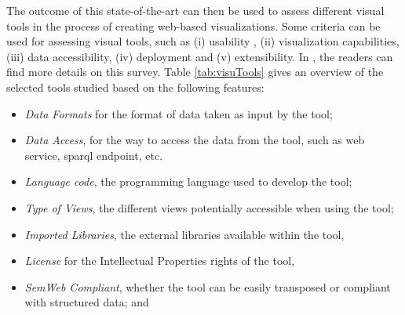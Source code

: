 The outcome of this state-of-the-art can then be used to assess different visual tools in the process of creating web-based visualizations. Some criteria can be used for assessing visual tools, such as (i) usability , (ii) visualization capabilities, (iii) data accessibility, (iv) deployment and (v) extensibility. In \cite{deliverable2012b}, the readers can find more details on this survey. Table \ref{tab:visuTools} gives an overview of the selected tools studied based on the following features:
\begin{itemize}
\item \textit{Data Formats} for the format of data taken as input by the tool;
\item \textit{Data Access}, for the way to access the data from the tool, such as web service, sparql endpoint, etc.
\item \textit{Language code}, the programming language used to develop the tool;
\item \textit{Type of Views}, the different views potentially accessible when using the tool;
\item \textit{Imported Libraries}, the external libraries available within the tool,
\item \textit{License} for the Intellectual Properties rights of the tool,
\item \textit{SemWeb Compliant}, whether the tool can be easily transposed or compliant with structured data; and 

\end{itemize}


